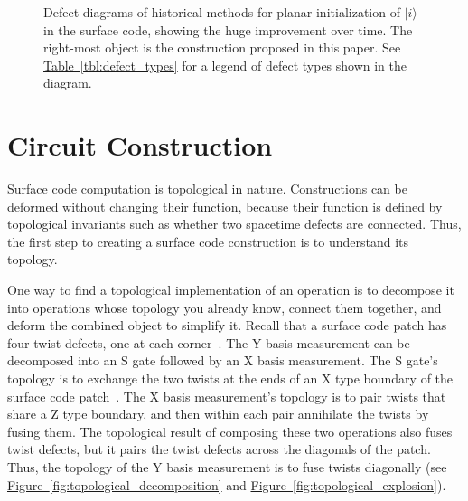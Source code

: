 \documentclass[onecolumn,unpublished,a4paper]{quantumarticle}
\theoremstyle{definition}
\theoremstyle{definition}
\theoremstyle{definition}
\newcommand{\fig}[1]{\hyperref[fig:#1]{Figure~\ref*{fig:#1}}}
\newcommand{\tbl}[1]{\hyperref[tbl:#1]{Table~\ref*{tbl:#1}}}
\begin{document}
\begin{figure}
    \centering
    \caption{
    Defect diagrams of historical methods for planar initialization of $|i\rangle$ in the surface code, showing the huge improvement over time.
    The right-most object is the construction proposed in this paper.
    See \tbl{defect_types} for a legend of defect types shown in the diagram.
    }
    \label{fig:historical_progression}
\end{figure}





\section{Circuit Construction}
\label{sec:construction}

Surface code computation is topological in nature.
Constructions can be deformed without changing their function, because their function is defined by topological invariants such as whether two spacetime defects are connected.
Thus, the first step to creating a surface code construction is to understand its topology.

One way to find a topological implementation of an operation is to decompose it into operations whose topology you already know, connect them together, and deform the combined object to simplify it.
Recall that a surface code patch has four twist defects, one at each corner~\cite{brown2017surfacetwists}.
The Y basis measurement can be decomposed into an S gate followed by an X basis measurement.
The S gate's topology is to exchange the two twists at the ends of an X type boundary of the surface code patch~\cite{brown2017surfacetwists}.
The X basis measurement's topology is to pair twists that share a Z type boundary, and then within each pair annihilate the twists by fusing them.
The topological result of composing these two operations also fuses twist defects, but it pairs the twist defects across the diagonals of the patch.
Thus, the topology of the Y basis measurement is to fuse twists diagonally (see \fig{topological_decomposition} and \fig{topological_explosion}).
\end{document}
